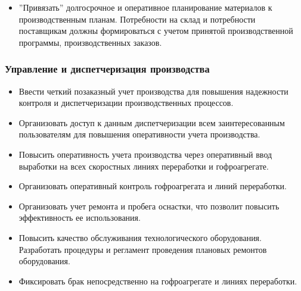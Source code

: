 \begin{itemize}
\item ''Привязать'' долгосрочное и оперативное планирование материалов к производственным планам. Потребности на склад и потребности поставщикам должны формироваться с учетом принятой производственной программы, производственных заказов. 
\end{itemize}


 \subsubsection{Управление и диспетчеризация производства}

 \begin{itemize}
\item Ввести четкий позаказный учет производства для повышения надежности контроля и диспетчеризации производственных процессов.
 \item Организовать доступ к данным диспетчеризации всем заинтересованным пользователям для повышения оперативности учета производства.
 \item Повысить оперативность учета производства через оперативный ввод выработки на всех скоростных линиях переработки и гофроагрегате.

 \item Организовать оперативный контроль гофроагрегата и линий переработки. 
\item Организовать учет ремонта и пробега оснастки, что позволит повысить эффективность ее использования. 
\item Повысить качество обслуживания технологического оборудования. Разработать процедуры и регламент проведения плановых ремонтов оборудования.
 \item Фиксировать брак непосредственно на гофроагрегате и линиях переработки.

 \end{itemize}


